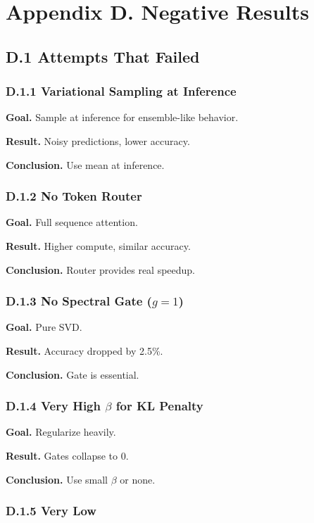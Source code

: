 \section{Appendix D. Negative Results}

\subsection{D.1 Attempts That Failed}

\subsubsection{D.1.1 Variational Sampling at Inference}

\textbf{Goal.} Sample at inference for ensemble-like behavior.

\textbf{Result.} Noisy predictions, lower accuracy.

\textbf{Conclusion.} Use mean at inference.

\subsubsection{D.1.2 No Token Router}

\textbf{Goal.} Full sequence attention.

\textbf{Result.} Higher compute, similar accuracy.

\textbf{Conclusion.} Router provides real speedup.

\subsubsection{D.1.3 No Spectral Gate ($g=1$)}

\textbf{Goal.} Pure SVD.

\textbf{Result.} Accuracy dropped by 2.5\%.

\textbf{Conclusion.} Gate is essential.

\subsubsection{D.1.4 Very High $\beta$ for KL Penalty}

\textbf{Goal.} Regularize heavily.

\textbf{Result.} Gates collapse to 0.

\textbf{Conclusion.} Use small $\beta$ or none.

\subsubsection{D.1.5 Very Low}

